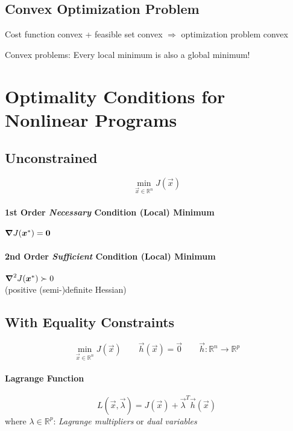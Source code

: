 \subsection{Convex Optimization Problem}

Cost function convex + feasible set convex $\Rightarrow$ optimization problem convex

Convex problems: Every local minimum is also a global minimum!

\section{Optimality Conditions for Nonlinear Programs}

\subsection{Unconstrained}
\begin{equation*}
\boxed{\min_{\vec x \in \mathbb R^n} J(\vec x)}
\end{equation*}

\paragraph{1st Order \emph{Necessary} Condition (Local) Minimum} $\grad J(\vec x^\ast) = \vec 0$

\paragraph{2nd Order \emph{Sufficient} Condition (Local) Minimum} $\grad^2 J(\vec x^\ast)  \succ 0$\\ (positive (semi-)definite Hessian)


\subsection{With Equality Constraints}
\begin{equation*}
\boxed{\min_{\vec x \in \mathbb R^n} J(\vec x) \qquad \vec{h}(\vec x) = \vec 0 \qquad \vec h:\mathbb R^n \to \mathbb R^p}
\end{equation*}

\paragraph{Lagrange Function}
\begin{equation*}
L(\vec x, \vec \lambda) = J(\vec x) + \vec \lambda^T \vec h(\vec x)
\end{equation*}
where $\lambda \in \mathbb R^p$: \emph{Lagrange multipliers} or \emph{dual variables}

